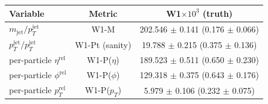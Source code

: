 \begin{ruledtabular}
  \begin{tabular}{lcc}
  \textbf{Variable} & \textbf{Metric} & \textbf{W1}$\times 10^3$ (truth) \\
  \hline
  $m_\mathrm{jet}/p_T^\mathrm{jet}$ & W1-M & 202.546 $\pm$ 0.141 (0.176 $\pm$ 0.066) \\
  $p_T^\mathrm{jet}/p_T^\mathrm{jet}$ & W1-Pt (sanity) & 19.788 $\pm$ 0.215 (0.375 $\pm$ 0.136) \\
  per-particle $\eta^\mathrm{rel}$ & W1-P($\eta$) & 189.523 $\pm$ 0.511 (0.650 $\pm$ 0.230) \\
  per-particle $\phi^\mathrm{rel}$ & W1-P($\phi$) & 129.318 $\pm$ 0.375 (0.643 $\pm$ 0.176) \\
  per-particle $p_T^\mathrm{rel}$ & W1-P($p_T$) & 5.979 $\pm$ 0.106 (0.232 $\pm$ 0.075) \\
  \end{tabular}
\end{ruledtabular}
